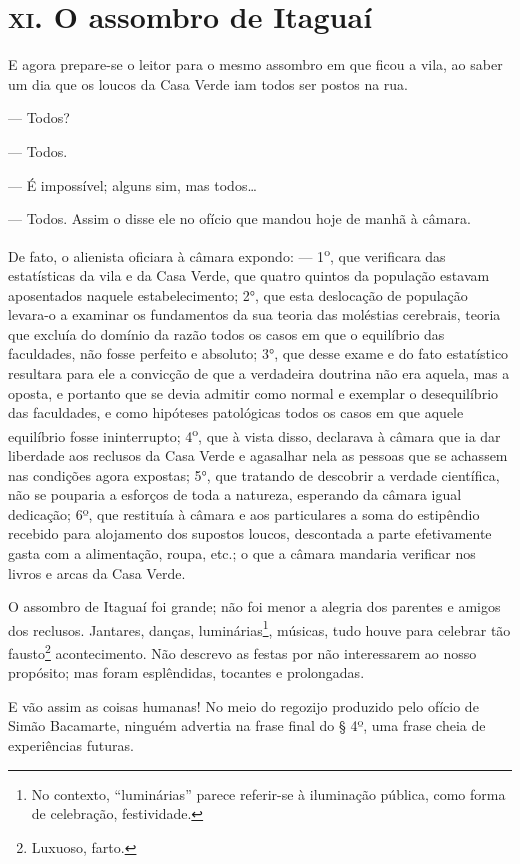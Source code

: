 \section*{\textsc{xi}. O assombro de Itaguaí}

E agora prepare-se o leitor para o mesmo assombro em que ficou a vila,
ao saber um dia que os loucos da Casa Verde iam todos ser postos na rua.

--- Todos?

--- Todos.

--- É impossível; alguns sim, mas todos\ldots{}

--- Todos. Assim o disse ele no ofício que mandou hoje de manhã à
câmara.

De fato, o alienista oficiara à câmara expondo: ---
1\textsuperscript{o}, que verificara das estatísticas da vila e da Casa
Verde, que quatro quintos da população estavam aposentados naquele
estabelecimento; 2°, que esta deslocação de população levara-o a
examinar os fundamentos da sua teoria das moléstias cerebrais, teoria
que excluía do domínio da razão todos os casos em que o equilíbrio das
faculdades, não fosse perfeito e absoluto; 3°, que desse exame e do fato
estatístico resultara para ele a convicção de que a verdadeira doutrina
não era aquela, mas a oposta, e portanto que se devia admitir como
normal e exemplar o desequilíbrio das faculdades, e como hipóteses
patológicas todos os casos em que aquele equilíbrio fosse ininterrupto;
4\textsuperscript{o}, que à vista disso, declarava à câmara que ia dar
liberdade aos reclusos da Casa Verde e agasalhar nela as pessoas que se
achassem nas condições agora expostas; 5°, que tratando de descobrir a
verdade científica, não se pouparia a esforços de toda a natureza,
esperando da câmara igual dedicação; 6º, que restituía à câmara e aos
particulares a soma do estipêndio recebido para alojamento dos supostos
loucos, descontada a parte efetivamente gasta com a alimentação, roupa,
etc.; o que a câmara mandaria verificar nos livros e arcas da Casa
Verde.

O assombro de Itaguaí foi grande; não foi menor a alegria dos parentes e
amigos dos reclusos. Jantares, danças, luminárias\footnote{No contexto,
  ``luminárias'' parece referir-se à iluminação pública, como forma de
  celebração, festividade.}, músicas, tudo houve para celebrar tão
fausto\footnote{Luxuoso, farto.} acontecimento. Não descrevo as festas
por não interessarem ao nosso propósito; mas foram esplêndidas, tocantes
e prolongadas.

E vão assim as coisas humanas! No meio do regozijo produzido pelo ofício
de Simão Bacamarte, ninguém advertia na frase final do § 4º, uma frase
cheia de experiências futuras.

